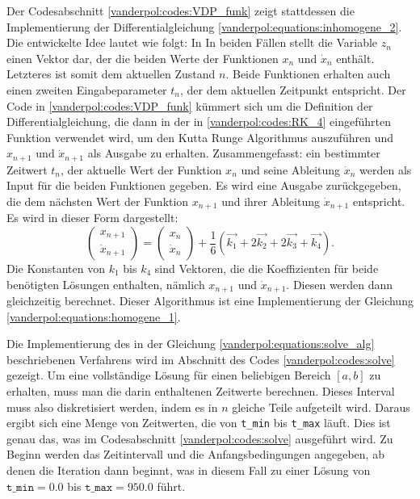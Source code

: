 Der Codesabschnitt \ref{vanderpol:codes:VDP_funk} zeigt stattdessen die Implementierung der Differentialgleichung \ref{vanderpol:equations:inhomogene_2}. Die entwickelte Idee lautet wie folgt: In In beiden Fällen stellt die Variable $z_n$ einen Vektor dar, der die beiden Werte der Funktionen $x_n$ und $\dot{x}_n$ enthält. Letzteres ist somit dem aktuellen Zustand $n$. Beide Funktionen erhalten auch einen zweiten Eingabeparameter $t_n$, der dem aktuellen Zeitpunkt entspricht. Der Code in \ref{vanderpol:codes:VDP_funk} kümmert sich um die Definition der Differentialgleichung, die dann in der in \ref{vanderpol:codes:RK_4} eingeführten Funktion verwendet wird, um den Kutta Runge Algorithmus auszuführen und $x_{n+1}$ und $\dot{x}_{n+1}$ als Ausgabe zu erhalten. Zusammengefasst: ein bestimmter Zeitwert $t_n$, der aktuelle Wert der Funktion $x_{n}$ und seine Ableitung $\dot{x}_{n}$ werden als Input für die beiden Funktionen gegeben. Es wird eine Ausgabe zurückgegeben, die dem nächsten Wert der Funktion $x_{n+1}$ und ihrer Ableitung $\dot{x}_{n+1}$ entspricht. Es wird in dieser Form dargestellt:
\begin{equation}
\begin{pmatrix}x_{n+1} \\ \dot{x}_{n+1} \end{pmatrix} = \begin{pmatrix}x_{n} \\ \dot{x}_{n} \end{pmatrix} + \frac{1}{6}(\vec{k_1} + 2\vec{k_2} + 2\vec{k_3} + \vec{k_4}).
\label{vanderpol:equations:solve_alg}
\end{equation}
Die Konstanten von $k_1$ bis $k_4$ sind Vektoren, die die Koeffizienten für beide benötigten Lösungen enthalten, nämlich $x_{n+1}$ und $\dot{x}_{n+1}$.
Diesen werden dann gleichzeitig berechnet. Dieser Algorithmus ist eine Implementierung der Gleichung \ref{vanderpol:equations:homogene_1}.

Die Implementierung des in der Gleichung \ref{vanderpol:equations:solve_alg} beschriebenen Verfahrens wird im Abschnitt des Codes \ref{vanderpol:codes:solve} gezeigt.
Um eine vollständige Lösung für einen beliebigen Bereich $[a, b]$ zu erhalten, muss man die darin enthaltenen Zeitwerte berechnen. Dieses Interval muss also diskretisiert werden, indem es in $n$ gleiche Teile aufgeteilt wird. Daraus ergibt sich eine Menge von Zeitwerten, die von \texttt{t\_min} bis \texttt{t\_max} läuft.
Dies ist genau das, was im Codesabschnitt \ref{vanderpol:codes:solve} ausgeführt wird. Zu Beginn werden das Zeitintervall und die Anfangsbedingungen angegeben, ab denen die Iteration dann beginnt, was in diesem Fall zu einer Lösung von $\texttt{t\_min}=0.0$ bis $\texttt{t\_max}=950.0$ führt.